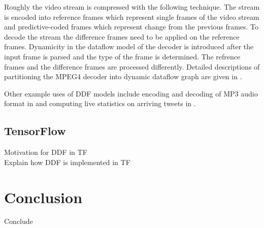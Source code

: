 \documentclass[conference,a4paper]{IEEEtran}
\begin{document}
Roughly the video stream is compressed with the following technique. The stream
is encoded into reference frames which represent single frames of the video
stream and predictive-coded frames which represent change from the previous
frames. To decode the stream the difference frames need to be applied on the
reference frames. Dynamicity in the dataflow model of the decoder is introduced
after the input frame is parsed and the type of the frame is determined. The
refrence frames and the difference frames are processed differently. Detailed
descriptions of partitioning the MPEG4 decoder into dynamic dataflow graph are
given in \cite{eker2003cal, roquier2008automatic}.

Other example uses of DDF models include encoding and decoding of MP3 audio
format in \cite{bhattacharyya2013handbook} and computing live statistics on
arriving tweets in \cite{murray2013naiad}.

\subsection{TensorFlow}
Motivation for DDF in TF \\
Explain how DDF is implemented in TF \\

\section{Conclusion}
Conclude \\



\end{document}
